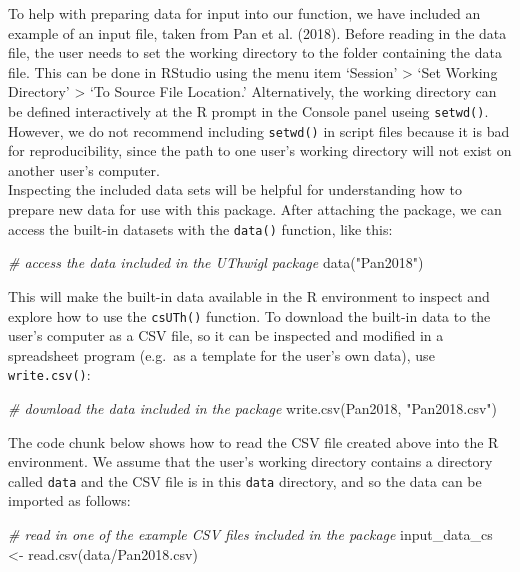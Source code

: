 \documentclass[]{elsarticle} %
\newenvironment{Shaded}{\begin{snugshade}}{\end{snugshade}}
\newcommand{\CommentTok}[1]{\textcolor[rgb]{0.56,0.35,0.01}{\textit{#1}}}
\newcommand{\FunctionTok}[1]{\textcolor[rgb]{0.00,0.00,0.00}{#1}}
\newcommand{\NormalTok}[1]{#1}
\newcommand{\OtherTok}[1]{\textcolor[rgb]{0.56,0.35,0.01}{#1}}
\newcommand{\StringTok}[1]{\textcolor[rgb]{0.31,0.60,0.02}{#1}}
\begin{document}
To help with preparing data for input into our function, we have included an example of an input file, taken from Pan et al. (2018). Before reading in the data file, the user needs to set the working directory to the folder containing the data file. This can be done in RStudio using the menu item `Session' \textgreater{} `Set Working Directory' \textgreater{} `To Source File Location.' Alternatively, the working directory can be defined interactively at the R prompt in the Console panel useing \texttt{setwd()}. However, we do not recommend including \texttt{setwd()} in script files because it is bad for reproducibility, since the path to one user's working directory will not exist on another user's computer.\\
Inspecting the included data sets will be helpful for understanding how to prepare new data for use with this package. After attaching the package, we can access the built-in datasets with the \texttt{data()} function, like this:

\begin{Shaded}
\begin{Highlighting}[]
\CommentTok{\# access the data included in the UThwigl package}
\FunctionTok{data}\NormalTok{(}\StringTok{"Pan2018"}\NormalTok{)}
\end{Highlighting}
\end{Shaded}

This will make the built-in data available in the R environment to inspect and explore how to use the \texttt{csUTh()} function.
To download the built-in data to the user's computer as a CSV file, so it can be inspected and modified in a spreadsheet program (e.g.~as a template for the user's own data), use \texttt{write.csv()}:

\begin{Shaded}
\begin{Highlighting}[]
\CommentTok{\# download the data included in the package}
\FunctionTok{write.csv}\NormalTok{(Pan2018, }\StringTok{"Pan2018.csv"}\NormalTok{)}
\end{Highlighting}
\end{Shaded}

The code chunk below shows how to read the CSV file created above into the R environment. We assume that the user's working directory contains a directory called \texttt{data} and the CSV file is in this \texttt{data} directory, and so the data can be imported as follows:

\begin{Shaded}
\begin{Highlighting}[]
\CommentTok{\# read in one of the example CSV files included in the package}
\NormalTok{input\_data\_cs }\OtherTok{\textless{}{-}} \FunctionTok{read.csv}\NormalTok{(}\StringTok{\textquotesingle{}data/Pan2018.csv\textquotesingle{}}\NormalTok{)}
\end{Highlighting}
\end{Shaded}
\end{document}
